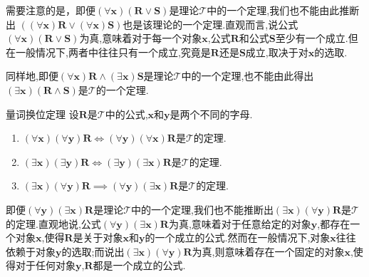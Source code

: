 \begin{remark}{}{}
	需要注意的是，即便$\left(\forall\boldsymbol{x}\right)\left(\boldsymbol{R}\vee\boldsymbol{S}\right)$是理论$\mathcal{T}$中的一个定理,我们也不能由此推断出 $\left(\left(\forall\boldsymbol{x}\right)\boldsymbol{R}\vee\left(\forall\boldsymbol{x}\right)\boldsymbol{S}\right)$也是该理论的一个定理.直观而言,说公式$\left(\forall\boldsymbol{x}\right)\left(\boldsymbol{R}\vee\boldsymbol{S}\right)$为真,意味着对于每一个对象$\boldsymbol{x}$,公式$\boldsymbol{R}$和公式$\boldsymbol{S}$至少有一个成立.但在一般情况下,两者中往往只有一个成立,究竟是$\boldsymbol{R}$还是$\boldsymbol{S}$成立,取决于对$\boldsymbol{x}$的选取.
	
	同样地,即便$\left(\forall\boldsymbol{x}\right)\boldsymbol{R}\wedge\left(\exists\boldsymbol{x}\right)\boldsymbol{S}$是理论$\mathcal{T}$中的一个定理,也不能由此得出$\left(\exists\boldsymbol{x}\right)\left(\boldsymbol{R}\wedge\boldsymbol{S}\right)$是$\mathcal{T}$的一个定理.
\end{remark}

\begin{metatheorem}{量词换位定理}{}
	设$\boldsymbol{R}$是$\mathcal{T}$中的公式,$\boldsymbol{x}$和$\boldsymbol{y}$是两个不同的字母.
	\begin{enumerate}
		\item $\left(\forall\boldsymbol{x}\right)\left(\forall\boldsymbol{y}\right)\boldsymbol{R}\iff\left(\forall\boldsymbol{y}\right)\left(\forall\boldsymbol{x}\right)\boldsymbol{R}$是$\mathcal{T}$的定理.
		\item $\left(\exists\boldsymbol{x}\right)\left(\exists\boldsymbol{y}\right)\boldsymbol{R}\iff\left(\exists\boldsymbol{y}\right)\left(\exists\boldsymbol{x}\right)\boldsymbol{R}$是$\mathcal{T}$的定理.
		\item $\left(\exists\boldsymbol{x}\right)\left(\forall\boldsymbol{y}\right)\boldsymbol{R}\implies\left(\forall\boldsymbol{y}\right)\left(\exists\boldsymbol{x}\right)\boldsymbol{R}$是$\mathcal{T}$的定理.
	\end{enumerate}
\end{metatheorem}

\begin{remark}{}{}
	即便$\left(\forall\boldsymbol{y}\right)\left(\exists\boldsymbol{x}\right)\boldsymbol{R}$是理论$\mathcal{T}$中的一个定理,我们也不能推断出$\left(\exists\boldsymbol{x}\right)\left(\forall\boldsymbol{y}\right)\boldsymbol{R}$是$\mathcal{T}$的定理.直观地说,公式$\left(\forall\boldsymbol{y}\right)\left(\exists\boldsymbol{x}\right)\boldsymbol{R}$为真,意味着对于任意给定的对象$\boldsymbol{y}$,都存在一个对象$\boldsymbol{x}$,使得$\boldsymbol{R}$是关于对象$\boldsymbol{x}$和$\boldsymbol{y}$的一个成立的公式.然而在一般情况下,对象$\boldsymbol{x}$往往依赖于对象$\boldsymbol{y}$的选取;而说出$\left(\exists\boldsymbol{x}\right)\left(\forall\boldsymbol{y}\right)\boldsymbol{R}$为真,则意味着存在一个固定的对象$\boldsymbol{x}$,使得对于任何对象$\boldsymbol{y}$,$\boldsymbol{R}$都是一个成立的公式.
\end{remark}

